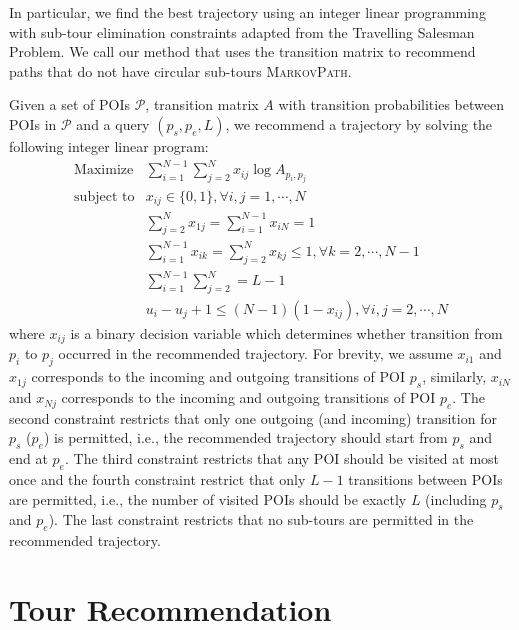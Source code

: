 In particular, we find the best trajectory using an integer linear programming with
sub-tour elimination constraints adapted from the Travelling Salesman Problem\cite{opt98}.
We call our method that uses the transition matrix to recommend paths
that do not have circular sub-tours \textsc{MarkovPath}.


Given a set of POIs $\mathcal{P}$, transition matrix $A$ with transition probabilities
between POIs in $\mathcal{P}$ and a query $(p_s, p_e, L)$,
we recommend a trajectory by solving the following integer linear program:
\begin{align*}
\text{Maximize} & \sum_{i=1}^{N-1} \sum_{j=2}^N x_{ij} \log A_{p_i, p_j} \\
\text{subject~to} & x_{ij} \in \{0, 1\}, \forall i, j = 1, \cdots, N \\
     & \sum_{j=2}^N x_{1j} = \sum_{i=1}^{N-1} x_{iN} = 1 \\
     & \sum_{i=1}^{N-1} x_{ik} = \sum_{j=2}^N x_{kj} \le 1, \forall k=2, \cdots, N-1 \\
     & \sum_{i=1}^{N-1} \sum_{j=2}^N = L-1 \\
     & u_i - u_j + 1 \le (N-1) (1-x_{ij}), \forall i, j = 2, \cdots, N
\end{align*}
where $x_{ij}$ is a binary decision variable which determines whether transition from $p_i$ to $p_j$
occurred in the recommended trajectory.
For brevity, we assume $x_{i1}$ and $x_{1j}$ corresponds to the incoming and outgoing transitions of POI $p_s$,
similarly, $x_{iN}$ and $x_{Nj}$ corresponds to the incoming and outgoing transitions of POI $p_e$.
The second constraint restricts that only one outgoing (and incoming) transition for $p_s$ ($p_e$)
is permitted, i.e., the recommended trajectory should start from $p_s$ and end at $p_e$.
The third constraint restricts that any POI should be visited at most once and the fourth constraint
restrict that only $L-1$ transitions between POIs are permitted, i.e., the number of visited POIs should be
exactly $L$ (including $p_s$ and $p_e$).
The last constraint restricts that no sub-tours are permitted in the recommended trajectory.



\section{Tour Recommendation}
\label{sec:recommendation}

